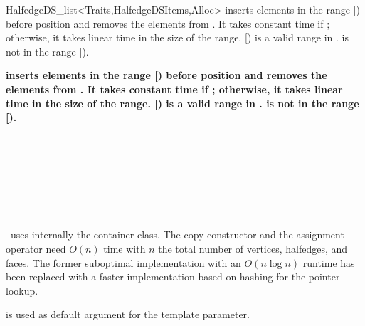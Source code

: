 \begin{ccRefClass}{HalfedgeDS_list<Traits,HalfedgeDSItems,Alloc>}
    {inserts elements in the range [) before position 
      and removes the elements from . It takes 
     constant time if \ccVar; otherwise, it takes linear
     time in the size of the range. \ccPrecond [) is a
     valid range in .  is not in the range
     [).}

    {\bf\ttfamily inserts elements in the range [) before position 
      and removes the elements from . It takes 
     constant time if \ccVar; otherwise, it takes linear
     time in the size of the range. \ccPrecond [) is a
     valid range in .  is not in the range
     [).}


\ccSeeAlso

\\
\\
\\
\\
\\
\\


\ccImplementation

\ccRefName\ uses internally the  container class.
The copy constructor and the assignment operator need $O(n)$ time with
$n$ the total number of vertices, halfedges, and faces. The former 
suboptimal implementation with an $O(n \log n)$ runtime has been replaced
with a faster implementation based on hashing for the pointer lookup.

 is used as default argument for the
 template parameter.  

\end{ccRefClass} %

\ccRefPageEnd
